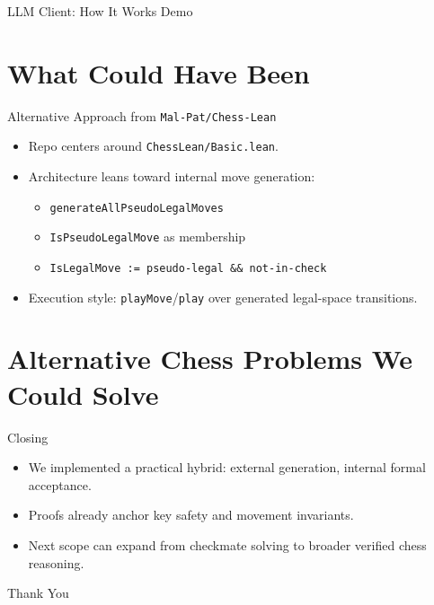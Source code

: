\documentclass{beamer}
\begin{document}
\begin{frame}{LLM Client: How It Works}
\centering
\Huge Demo
\end{frame}

\section{What Could Have Been}

\begin{frame}{Alternative Approach from \texttt{Mal-Pat/Chess-Lean}}
\begin{itemize}
  \item Repo centers around \texttt{ChessLean/Basic.lean}.
  \item Architecture leans toward internal move generation:
  \begin{itemize}
    \item \texttt{generateAllPseudoLegalMoves}
    \item \texttt{IsPseudoLegalMove} as membership
    \item \texttt{IsLegalMove := pseudo-legal \&\& not-in-check}
  \end{itemize}
  \item Execution style: \texttt{playMove}/\texttt{play} over generated legal-space transitions.
\end{itemize}
\end{frame}

\section{Alternative Chess Problems We Could Solve}

\begin{frame}{Closing}
\begin{itemize}
  \item We implemented a practical hybrid: external generation, internal formal acceptance.
  \item Proofs already anchor key safety and movement invariants.
  \item Next scope can expand from checkmate solving to broader verified chess reasoning.
\end{itemize}
\end{frame}

\begin{frame}
\centering
\Huge Thank You
\end{frame}
\end{document}
